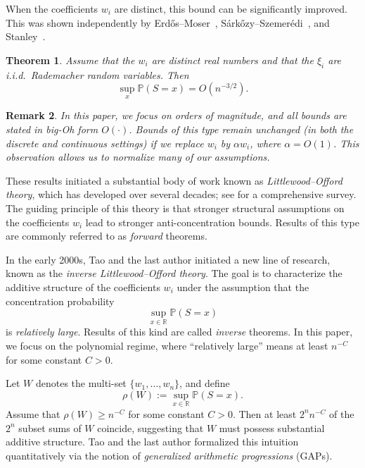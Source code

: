 \documentclass[reqno]{amsart}
\newcommand\R{{\mathbb{R}}}
\renewcommand\P{{\mathbb{P}}}
\theoremstyle{plain}
\newtheorem{theorem}{Theorem}[section]
\newtheorem{remark}[theorem]{Remark}
\theoremstyle{definition}
\begin{document}
\vskip2mm 

When the coefficients $w_i$ are distinct, this bound can be significantly
improved. This was shown independently by Erd\H{o}s--Moser~\cite{EM},
S\'ark\H{o}zy--Szemer\'edi~\cite{SS}, and Stanley~\cite{Stan}.

\begin{theorem}\label{thm:SSz}
Assume that the $w_i$ are distinct real numbers and that the $\xi_i$ are i.i.d.\
Rademacher random variables. Then
\[
\sup_x \P(S=x) = O(n^{-3/2}).
\]
\end{theorem}

\begin{remark}\label{remark:scaling}
In this paper, we focus on orders of magnitude, and all bounds are stated in
big-Oh form $O(\cdot)$. Bounds of this type remain unchanged (in both the
discrete and continuous settings) if we replace $w_i$ by $\alpha w_i$, where
$\alpha = O(1)$. This observation allows us to normalize many of our
assumptions.
\end{remark}

These results initiated a substantial body of work known as
\emph{Littlewood--Offord theory}, which has developed over several decades; see
\cite{NVsur} for a comprehensive survey. The guiding principle of this theory
is that stronger structural assumptions on the coefficients $w_i$ lead to
stronger anti-concentration bounds. Results of this type are commonly referred
to as \emph{forward} theorems.

In the early 2000s, Tao and the last author initiated a new line of research,
known as the \emph{inverse Littlewood--Offord theory}. The goal is to
characterize the additive structure of the coefficients $w_i$ under the
assumption that the concentration probability
\[
\sup_{x\in\R} \P(S=x)
\]
is \emph{relatively large}. Results of this kind are called \emph{inverse}
theorems. In this paper, we focus on the polynomial regime, where “relatively
large” means at least $n^{-C}$ for some constant $C>0$.


Let $W$ denotes the multi-set $\{w_1, \dots, w_n \}$, and define 
  \[ \rho(W) := \sup_{x \in \R} \P(S = x).\]
  Assume that  \( \rho(W)\ge n^{-C} \)  for some constant $C>0$. Then at least \( 2^n n^{-C} \) of the \( 2^n \) subset sums of $W$ coincide, suggesting
  that \( W \) must possess substantial additive structure.  Tao and the last author formalized this intuition quantitatively via
the notion of \emph{generalized arithmetic progressions} (GAPs).
\end{document}

